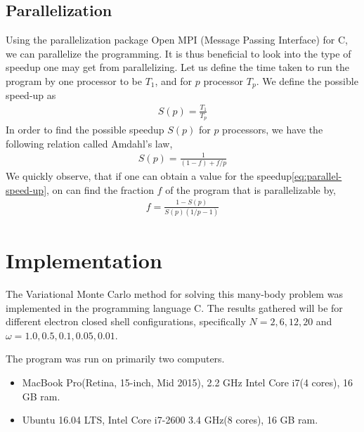 \documentclass[11pt]{article}
\newcommand{\husk}[1]{\color{red} #1 \color{black}}
\newcommand{\CC}{C\nolinebreak\hspace{-.05em}\raisebox{.4ex}{\tiny\bf +}\nolinebreak\hspace{-.10em}\raisebox{.4ex}{\tiny\bf +}}
\def\CC{{C\nolinebreak[4]\hspace{-.05em}\raisebox{.4ex}{\tiny\bf ++}}}
\begin{document}
\subsection{Parallelization}
Using the parallelization package Open MPI (Message Passing Interface) for \CC, we can parallelize the programming. It is thus beneficial to look into the type of speedup one may get from parallelizing. Let us define the time taken to run the program by one processor to be $T_1$, and for $p$ processor $T_p$. We define the possible speed-up as
\begin{align}
	S(p) = \frac{T_1}{T_p}
	\label{eq:parallel-speed-up}
\end{align}
In order to find the possible speedup $S(p)$ for $p$ processors, we have the following relation called Amdahl's law\cite{Amdahl:1967:VSP:1465482.1465560},
\begin{align}
	S(p) = \frac{1}{(1-f) + f/p}
	\label{eq:amdahls-law}
\end{align}
We quickly observe, that if one can obtain a value for the speedup\eqref{eq:parallel-speed-up}, on can find the fraction $f$ of the program that is parallelizable by,
\begin{align}
	f = \frac{1-S(p)}{S(p)(1/p-1)}
	\label{eq:f-parallelizable-fraction}
\end{align}

\section{Implementation}
The Variational Monte Carlo method for solving this many-body problem was implemented in the programming language \CC. The results gathered will be for different electron closed shell configurations, specifically $N = 2, 6, 12, 20$ and $\omega = 1.0, 0.5, 0.1, 0.05, 0.01$.

The program was run on primarily two computers.
\begin{itemize}
	\item MacBook Pro(Retina, 15-inch, Mid 2015), 2.2 GHz Intel Core i7(4 cores), 16 GB ram.
	\item Ubuntu 16.04 LTS, Intel Core i7-2600 3.4 GHz(8 cores), 16 GB ram.
\end{itemize}

\end{document}
